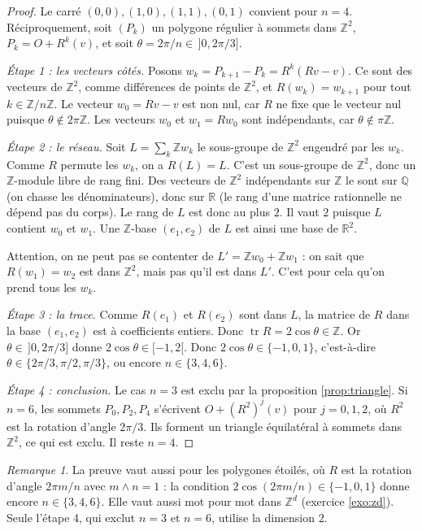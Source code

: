 \documentclass[11pt,a4paper]{article}
\theoremstyle{plain}
\theoremstyle{definition}
\theoremstyle{remark}
\newtheorem{remarque}[theoreme]{Remarque}
\newcommand{\Z}{\mathbb{Z}}
\newcommand{\Q}{\mathbb{Q}}
\newcommand{\R}{\mathbb{R}}
\newcommand{\pgcd}{\wedge}
\DeclareMathOperator{\tr}{tr}
\begin{document}
\begin{proof}
Le carré $(0,0),(1,0),(1,1),(0,1)$ convient pour $n=4$. Réciproquement, soit $(P_k)$ un polygone régulier à sommets dans $\Z^2$, $P_k=O+R^k(v)$, et soit $\theta=2\pi/n\in\,]0,2\pi/3]$.

\emph{Étape 1 : les vecteurs côtés.} Posons $w_k=P_{k+1}-P_k=R^k(Rv-v)$. Ce sont des vecteurs de $\Z^2$, comme différences de points de $\Z^2$, et $R(w_k)=w_{k+1}$ pour tout $k\in\Z/n\Z$. Le vecteur $w_0=Rv-v$ est non nul, car $R$ ne fixe que le vecteur nul puisque $\theta\notin2\pi\Z$. Les vecteurs $w_0$ et $w_1=Rw_0$ sont indépendants, car $\theta\notin\pi\Z$.

\emph{Étape 2 : le réseau.} Soit $L=\sum_{k}\Z w_k$ le sous-groupe de $\Z^2$ engendré par les $w_k$. Comme $R$ permute les $w_k$, on a $R(L)=L$. C'est un sous-groupe de $\Z^2$, donc un $\Z$-module libre de rang fini. Des vecteurs de $\Z^2$ indépendants sur $\Z$ le sont sur $\Q$ (on chasse les dénominateurs), donc sur $\R$ (le rang d'une matrice rationnelle ne dépend pas du corps). Le rang de $L$ est donc au plus $2$. Il vaut $2$ puisque $L$ contient $w_0$ et $w_1$. Une $\Z$-base $(e_1,e_2)$ de $L$ est ainsi une base de $\R^2$.

Attention, on ne peut pas se contenter de $L'=\Z w_0+\Z w_1$ : on sait que $R(w_1)=w_2$ est dans $\Z^2$, mais pas qu'il est dans $L'$. C'est pour cela qu'on prend tous les $w_k$.

\emph{Étape 3 : la trace.} Comme $R(e_1)$ et $R(e_2)$ sont dans $L$, la matrice de $R$ dans la base $(e_1,e_2)$ est à coefficients entiers. Donc $\tr R=2\cos\theta\in\Z$. Or $\theta\in\,]0,2\pi/3]$ donne $2\cos\theta\in[-1,2[$. Donc $2\cos\theta\in\{-1,0,1\}$, c'est-à-dire $\theta\in\{2\pi/3,\pi/2,\pi/3\}$, ou encore $n\in\{3,4,6\}$.

\emph{Étape 4 : conclusion.} Le cas $n=3$ est exclu par la proposition \ref{prop:triangle}. Si $n=6$, les sommets $P_0,P_2,P_4$ s'écrivent $O+(R^2)^j(v)$ pour $j=0,1,2$, où $R^2$ est la rotation d'angle $2\pi/3$. Ils forment un triangle équilatéral à sommets dans $\Z^2$, ce qui est exclu. Il reste $n=4$.
\end{proof}

\begin{remarque}
La preuve vaut aussi pour les polygones étoilés, où $R$ est la rotation d'angle $2\pi m/n$ avec $m\pgcd n=1$ : la condition $2\cos(2\pi m/n)\in\{-1,0,1\}$ donne encore $n\in\{3,4,6\}$. Elle vaut aussi mot pour mot dans $\Z^d$ (exercice \ref{exo:zd}). Seule l'étape 4, qui exclut $n=3$ et $n=6$, utilise la dimension $2$.
\end{remarque}
\end{document}
